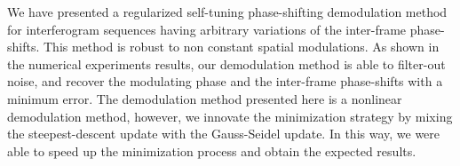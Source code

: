 We have presented a regularized self-tuning phase-shifting 
demodulation method for interferogram sequences having arbitrary variations of 
the inter-frame phase-shifts. This method is robust to non constant spatial 
modulations. As shown in the numerical experiments results, our demodulation 
method is able to filter-out noise, and recover the modulating phase and the 
inter-frame phase-shifts with a minimum error. The demodulation method presented 
here is a nonlinear demodulation method, however, we innovate the minimization 
strategy by mixing the steepest-descent update with the Gauss-Seidel update. In 
this way, we were able to speed up the minimization process and obtain the 
expected results.




%
%











